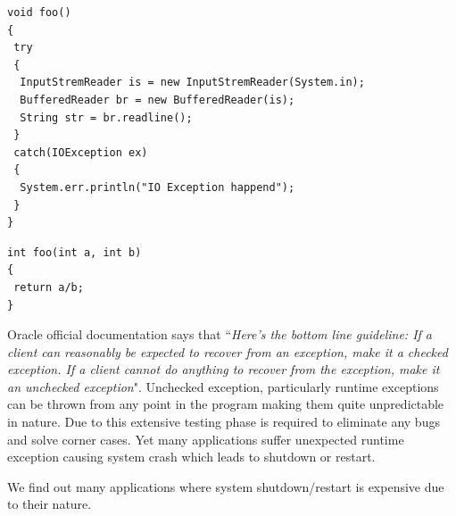 \lstset{language=Java, caption=Example 2 of java checked exception ,
label=checkedexception1}
\begin{lstlisting}
void foo()
{
 try
 {
  InputStremReader is = new InputStremReader(System.in);
  BufferedReader br = new BufferedReader(is);
  String str = br.readline();
 }
 catch(IOException ex)
 {
  System.err.println("IO Exception happend");
 }
}

\end{lstlisting}

\lstset{language=Java, caption=Example of java unchecked exception,
label=uncheckedexception}
\begin{lstlisting}
int foo(int a, int b)
{
 return a/b;
}
\end{lstlisting}

\doublespacing

Oracle official documentation says that ``\emph{Here's the bottom line
guideline: If a client can reasonably be expected to recover from an exception,
make it a checked exception. If a client cannot do anything to recover from the
exception, make it an unchecked exception}".
Unchecked exception, particularly runtime exceptions can be thrown from any
point in the program making them quite unpredictable in nature.
Due to this extensive testing phase is required to eliminate any bugs and solve
corner cases.
Yet many applications suffer unexpected runtime exception causing system crash
which leads to shutdown or restart.

We find out many applications where system shutdown/restart is expensive due to
their nature.

% 

